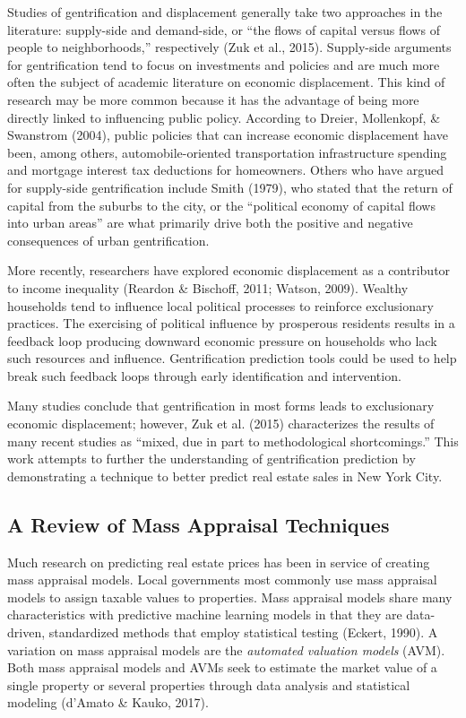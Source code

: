 \documentclass[12pt,]{article}
\begin{document}
Studies of gentrification and displacement generally take two approaches
in the literature: supply-side and demand-side, or ``the flows of
capital versus flows of people to neighborhoods,'' respectively (Zuk et
al., 2015). Supply-side arguments for gentrification tend to focus on
investments and policies and are much more often the subject of academic
literature on economic displacement. This kind of research may be more
common because it has the advantage of being more directly linked to
influencing public policy. According to Dreier, Mollenkopf, \& Swanstrom
(2004), public policies that can increase economic displacement have
been, among others, automobile-oriented transportation infrastructure
spending and mortgage interest tax deductions for homeowners. Others who
have argued for supply-side gentrification include Smith (1979), who
stated that the return of capital from the suburbs to the city, or the
``political economy of capital flows into urban areas'' are what
primarily drive both the positive and negative consequences of urban
gentrification.

More recently, researchers have explored economic displacement as a
contributor to income inequality (Reardon \& Bischoff, 2011; Watson,
2009). Wealthy households tend to influence local political processes to
reinforce exclusionary practices. The exercising of political influence
by prosperous residents results in a feedback loop producing downward
economic pressure on households who lack such resources and influence.
Gentrification prediction tools could be used to help break such
feedback loops through early identification and intervention.

Many studies conclude that gentrification in most forms leads to
exclusionary economic displacement; however, Zuk et al. (2015)
characterizes the results of many recent studies as ``mixed, due in part
to methodological shortcomings.'' This work attempts to further the
understanding of gentrification prediction by demonstrating a technique
to better predict real estate sales in New York City.

\hypertarget{a-review-of-mass-appraisal-techniques}{%
\subsection{A Review of Mass Appraisal
Techniques}\label{a-review-of-mass-appraisal-techniques}}

Much research on predicting real estate prices has been in service of
creating mass appraisal models. Local governments most commonly use mass
appraisal models to assign taxable values to properties. Mass appraisal
models share many characteristics with predictive machine learning
models in that they are data-driven, standardized methods that employ
statistical testing (Eckert, 1990). A variation on mass appraisal models
are the \emph{automated valuation models} (AVM). Both mass appraisal
models and AVMs seek to estimate the market value of a single property
or several properties through data analysis and statistical modeling
(d'Amato \& Kauko, 2017).
\end{document}
